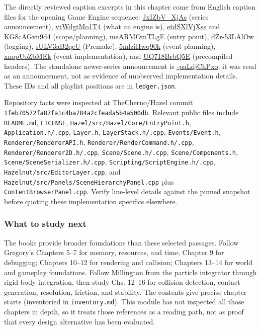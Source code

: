 The directly reviewed caption excerpts in this chapter come from English caption files for the opening Game Engine sequence: \href{https://www.youtube.com/watch?v=JxIZbV_XjAs}{JxIZbV\_XjAs} (series announcement), \href{https://www.youtube.com/watch?v=vtWdgtMo1T4}{vtWdgtMo1T4} (what an engine is), \href{https://www.youtube.com/watch?v=etdSXlVjXss}{etdSXlVjXss} and \href{https://www.youtube.com/watch?v=KG8cAGvn9d4}{KG8cAGvn9d4} (scope/planning), \href{https://www.youtube.com/watch?v=meARMOmTLgE}{meARMOmTLgE} (entry point), \href{https://www.youtube.com/watch?v=dZr-53LAlOw}{dZr-53LAlOw} (logging), \href{https://www.youtube.com/watch?v=sULV3aB2qeU}{sULV3aB2qeU} (Premake), \href{https://www.youtube.com/watch?v=5mlziHwq90k}{5mlziHwq90k} (event planning), \href{https://www.youtube.com/watch?v=xnopUoZbMEk}{xnopUoZbMEk} (event implementation), and \href{https://www.youtube.com/watch?v=UQ718BrbQ5E}{UQ718BrbQ5E} (precompiled headers). The standalone newer-series announcement is \href{https://www.youtube.com/watch?v=-paLdjChPxo}{-paLdjChPxo}; it was read as an announcement, not as evidence of unobserved implementation details. These IDs and all playlist positions are in \texttt{ledger.json}.

Repository facts were inspected at TheCherno/Hazel commit \texttt{1feb70572fa87fa1c4ba784a2cfeada5b4a500db}. Relevant public files include \texttt{README.md}, \texttt{LICENSE}, \texttt{Hazel/src/Hazel/Core/EntryPoint.h}, \texttt{Application.h/.cpp}, \texttt{Layer.h}, \texttt{LayerStack.h/.cpp}, \texttt{Events/Event.h}, \texttt{Renderer/RendererAPI.h}, \texttt{Renderer/RenderCommand.h/.cpp}, \texttt{Renderer/Renderer2D.h/.cpp}, \texttt{Scene/Scene.h/.cpp}, \texttt{Scene/Components.h}, \texttt{Scene/SceneSerializer.h/.cpp}, \texttt{Scripting/ScriptEngine.h/.cpp}, \texttt{Hazelnut/src/EditorLayer.cpp}, and \texttt{Hazelnut/src/Panels/SceneHierarchyPanel.cpp} plus \texttt{ContentBrowserPanel.cpp}. Verify line-level details against the pinned snapshot before quoting these implementation specifics elsewhere.

\subsubsection{What to study next}\label{what-to-study-next}

The books provide broader foundations than these selected passages. Follow Gregory's Chapters 5--7 for memory, resources, and time; Chapter 9 for debugging; Chapters 10--12 for rendering and collision; Chapters 13--14 for world and gameplay foundations. Follow Millington from the particle integrator through rigid-body integration, then study Chs. 12--16 for collision detection, contact generation, resolution, friction, and stability. The contents give precise chapter starts (inventoried in \texttt{inventory.md}). This module has not inspected all those chapters in depth, so it treats those references as a reading path, not as proof that every design alternative has been evaluated.

